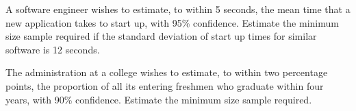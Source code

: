 \begin{exercise}

A software engineer wishes to estimate, to within 5 seconds, the mean
time that a new application takes to start up, with 95\% confidence.
Estimate the minimum size sample required if the standard deviation of
start up times for similar software is 12 seconds.

\end{exercise}
\vspace*{8\baselineskip}

\begin{exercise}

The administration at a college wishes to estimate, to within two
percentage points, the proportion of all its entering freshmen who
graduate within four years, with 90\% confidence. Estimate the minimum
size sample required.

\end{exercise}
\vspace*{8\baselineskip}

